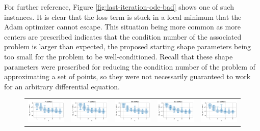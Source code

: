 \documentclass[12pt]{report} %
\begin{document}
For further reference, Figure \ref{fig:last-iteration-ode-bad} shows one of such instances. It is clear that the loss term is stuck in a local minimum that the Adam optimizer cannot escape. This situation being more common as more centers are prescribed indicates that the condition number of the associated problem is larger than expected, the proposed starting shape parameters being too small for the problem to be well-conditioned. Recall that these shape parameters were prescribed for reducing the condition number of the problem of approximating a set of points, so they were not necessarily guaranteed to work for an arbitrary differential equation.

\clearpage
\begin{figure}
  \hspace*{-1cm}
  \begin{tabular}{ccccc}
    {\includegraphics[width=.014\textwidth,clip=true,trim={0 .59cm 9cm 0}]{imagenes/experiments/1d/ode/violins_linf_u_xx-2_C7_gaussian_kernel_shape_0.78125_Poly-1.pdf}} & {\includegraphics[width=.2\textwidth,clip=true,trim={.81cm .59cm 0 0}]{imagenes/experiments/1d/ode/violins_linf_u_xx-2_C7_gaussian_kernel_shape_0.78125_Poly-1.pdf}}   & \includegraphics[width=.2\textwidth,clip=true,trim={.81cm .59cm 0 0}]{imagenes/experiments/1d/ode/violins_linf_u_xx-2_C11_gaussian_kernel_shape_1.5625_Poly-1.pdf}   & \includegraphics[width=.2\textwidth,clip=true,trim={.81cm .59cm 0 0}]{imagenes/experiments/1d/ode/violins_linf_u_xx-2_C15_gaussian_kernel_shape_2.5_Poly-1.pdf}   & \includegraphics[width=.2\textwidth,clip=true,trim={.81cm .59cm 0 0}]{imagenes/experiments/1d/ode/violins_linf_u_xx-2_C20_gaussian_kernel_shape_3.23_Poly-1.pdf}   \\

\end{tabular}
\end{figure}
\end{document}
